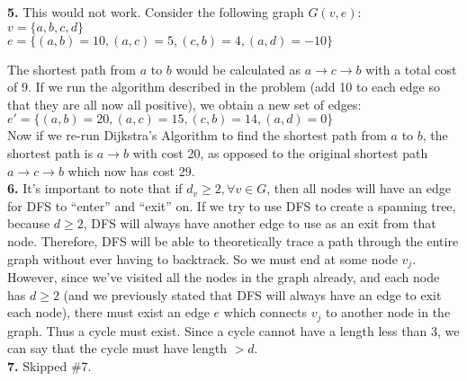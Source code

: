 \documentclass[12pt]{report}
\newcommand{\no}{\noindent}
\begin{document}
	\no \textbf{5.} This would not work. Consider the following graph $G(v,e)$:\\
	
	\centering
	$v=\{a, b, c, d\}$ \\
	$e = \{(a,b) = 10, (a, c) = 5, (c, b) = 4, (a,d) = -10\}$\\ 
	\justify
	
	The shortest path from $a$ to $b$ would be calculated as $a\rightarrow c \rightarrow b$ with a total cost of 9. If we run the algorithm described in the problem (add 10 to each edge so that they are all now all positive), we obtain a new set of edges: \\
	
	\centering
	$e' = \{(a,b) = 20, (a,c) = 15, (c,b) = 14, (a,d) = 0\}$\\
	\justify
	Now if we re-run Dijkstra's Algorithm to find the shortest path from $a$ to $b$, the shortest path is $a\rightarrow b$ with cost 20, as opposed to the original shortest path $a\rightarrow c \rightarrow b$ which now has cost 29. \\
	
	\no \textbf{6.} It's important to note that if $d_v \geq 2, \forall v \in G$, then all nodes will have an edge for DFS to ``enter'' and ``exit'' on. If we try to use DFS to create a spanning tree, because $d \geq 2$, DFS will always have another edge to use as an exit from that node. Therefore, DFS will be able to theoretically trace a path through the entire graph without ever having to backtrack. So we must end at some node $v_j$. However, since we've visited all the nodes in the graph already, and each node has $d \geq 2$ (and we previously stated that DFS will always have an edge to exit each node), there must exist an edge $e$ which connects $v_j$ to another node in the graph. Thus a cycle must exist. Since a cycle cannot have a length less than 3, we can say that the cycle must have length $> d$.\\

	\no \textbf{7.} Skipped \#7.\\
\end{document}

